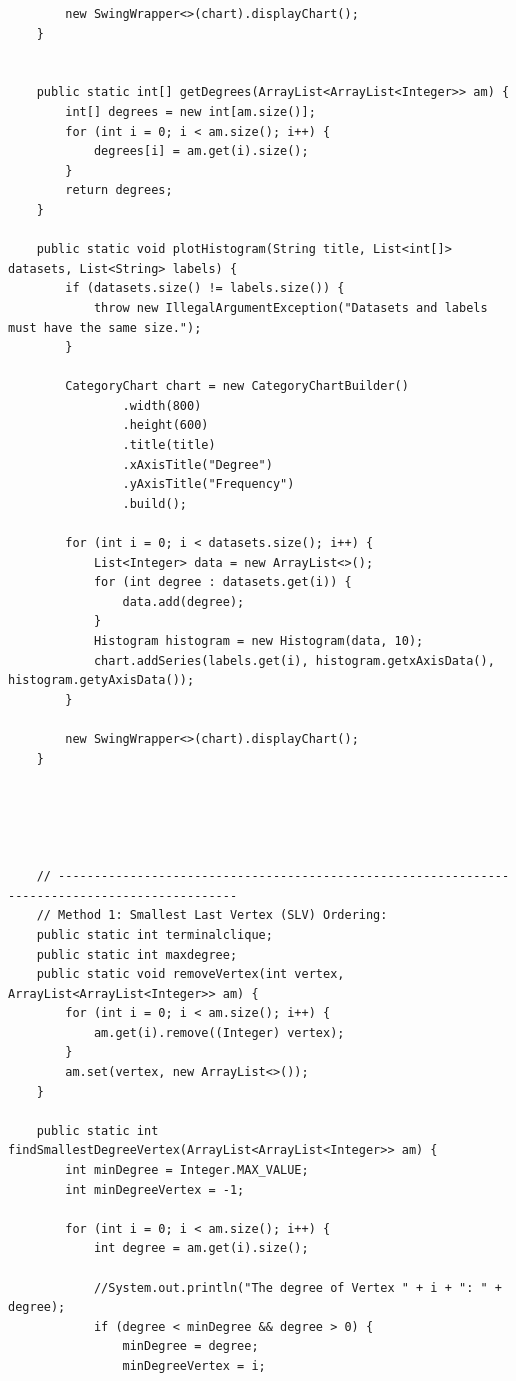 \documentclass{article}
\begin{document}
\begin{verbatim}
        new SwingWrapper<>(chart).displayChart();
    }


    public static int[] getDegrees(ArrayList<ArrayList<Integer>> am) {
        int[] degrees = new int[am.size()];
        for (int i = 0; i < am.size(); i++) {
            degrees[i] = am.get(i).size();
        }
        return degrees;
    }

    public static void plotHistogram(String title, List<int[]> datasets, List<String> labels) {
        if (datasets.size() != labels.size()) {
            throw new IllegalArgumentException("Datasets and labels must have the same size.");
        }

        CategoryChart chart = new CategoryChartBuilder()
                .width(800)
                .height(600)
                .title(title)
                .xAxisTitle("Degree")
                .yAxisTitle("Frequency")
                .build();

        for (int i = 0; i < datasets.size(); i++) {
            List<Integer> data = new ArrayList<>();
            for (int degree : datasets.get(i)) {
                data.add(degree);
            }
            Histogram histogram = new Histogram(data, 10);
            chart.addSeries(labels.get(i), histogram.getxAxisData(), histogram.getyAxisData());
        }

        new SwingWrapper<>(chart).displayChart();
    }





    // -----------------------------------------------------------------------------------------------
    // Method 1: Smallest Last Vertex (SLV) Ordering:
    public static int terminalclique;
    public static int maxdegree;
    public static void removeVertex(int vertex, ArrayList<ArrayList<Integer>> am) {
        for (int i = 0; i < am.size(); i++) {
            am.get(i).remove((Integer) vertex);
        }
        am.set(vertex, new ArrayList<>());
    }

    public static int findSmallestDegreeVertex(ArrayList<ArrayList<Integer>> am) {
        int minDegree = Integer.MAX_VALUE;
        int minDegreeVertex = -1;

        for (int i = 0; i < am.size(); i++) {
            int degree = am.get(i).size();

            //System.out.println("The degree of Vertex " + i + ": " + degree);
            if (degree < minDegree && degree > 0) {
                minDegree = degree;
                minDegreeVertex = i;


\end{verbatim}
\end{document}
